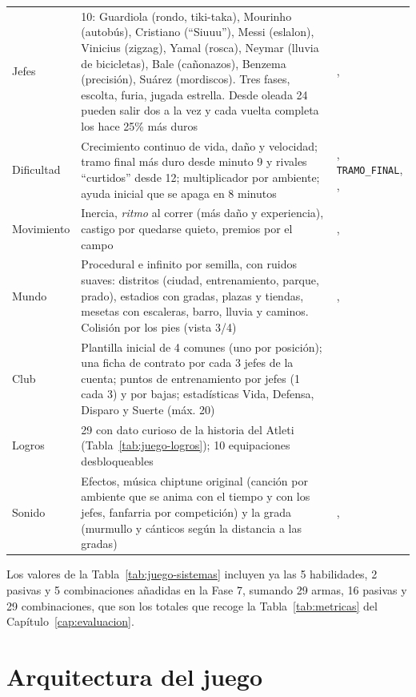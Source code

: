 \begin{longtable}{@{}L{2.2cm} L{5.8cm} L{3.0cm}@{}}
Jefes & 10: Guardiola (rondo, tiki-taka), Mourinho (autobús), Cristiano (``Siuuu''), Messi (eslalon), Vinicius (zigzag), Yamal (rosca), Neymar (lluvia de bicicletas), Bale (cañonazos), Benzema (precisión), Suárez (mordiscos). Tres fases, escolta, furia, jugada estrella. Desde oleada 24 pueden salir dos a la vez y cada vuelta completa los hace 25\% más duros & ,  \\
Dificultad & Crecimiento continuo de vida, daño y velocidad; tramo final más duro desde minuto 9 y rivales ``curtidos'' desde 12; multiplicador por ambiente; ayuda inicial que se apaga en 8 minutos & , \texttt{TRAMO\_FINAL}, ,  \\
Movimiento & Inercia, \textit{ritmo} al correr (más daño y experiencia), castigo por quedarse quieto, premios por el campo & ,  \\
Mundo & Procedural e infinito por semilla, con ruidos suaves: distritos (ciudad, entrenamiento, parque, prado), estadios con gradas, plazas y tiendas, mesetas con escaleras, barro, lluvia y caminos. Colisión por los pies (vista 3/4) & ,  \\
Club & Plantilla inicial de 4 comunes (uno por posición); una ficha de contrato por cada 3 jefes de la cuenta; puntos de entrenamiento por jefes (1 cada 3) y por bajas; estadísticas Vida, Defensa, Disparo y Suerte (máx. 20) &  \\
Logros & 29 con dato curioso de la historia del Atleti (Tabla~\ref{tab:juego-logros}); 10 equipaciones desbloqueables &  \\
Sonido & Efectos, música chiptune original (canción por ambiente que se anima con el tiempo y con los jefes, fanfarria por competición) y la grada (murmullo y cánticos según la distancia a las gradas) & ,  \\*
\bottomrule
\end{longtable}

Los valores de la Tabla~\ref{tab:juego-sistemas} incluyen ya las 5 habilidades, 2 pasivas y 5 combinaciones añadidas en la Fase 7, sumando 29 armas, 16 pasivas y 29 combinaciones, que son los totales que recoge la Tabla~\ref{tab:metricas} del Capítulo~\ref{cap:evaluacion}.

\section{Arquitectura del juego}
\label{sec:juego-arquitectura}


